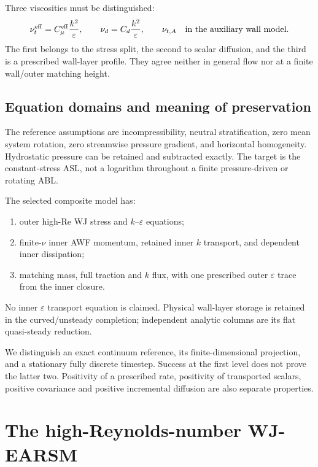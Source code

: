 \documentclass[11pt,a4paper]{article}
\numberwithin{equation}{section}
\newcommand{\eps}{\varepsilon}
\begin{document}
Three viscosities must be distinguished:
\begin{equation}
 \nu_t^{\rm eff}=C_\mu^{\rm eff}\frac{k^2}{\eps},
 \qquad \nu_d=C_d\frac{k^2}{\eps},
 \qquad \nu_{t,A}\quad\hbox{in the auxiliary wall model}.
 \label{eq:three-viscosities}
\end{equation}
The first belongs to the stress split, the second to scalar diffusion,
and the third is a prescribed wall-layer profile. They agree neither
in general flow nor at a finite wall/outer matching height.

\subsection{Equation domains and meaning of preservation}
The reference assumptions are incompressibility, neutral stratification,
zero mean system rotation, zero streamwise pressure gradient, and
horizontal homogeneity. Hydrostatic pressure can be retained and
subtracted exactly. The target is the constant-stress ASL, not a
logarithm throughout a finite pressure-driven or rotating ABL.

The selected composite model has:
\begin{enumerate}
\item outer high-Re WJ stress and $k$--$\eps$ equations;
\item finite-$\nu$ inner AWF momentum, retained inner $k$ transport,
and dependent inner dissipation;
\item matching mass, full traction and $k$ flux, with one prescribed
outer $\eps$ trace from the inner closure.
\end{enumerate}
No inner $\eps$ transport equation is claimed. Physical wall-layer
storage is retained in the curved/unsteady completion; independent
analytic columns are its flat quasi-steady reduction.

We distinguish an exact continuum reference, its finite-dimensional
projection, and a stationary fully discrete timestep. Success at the
first level does not prove the latter two. Positivity of a prescribed
rate, positivity of transported scalars, positive covariance and
positive incremental diffusion are also separate properties.

\section{The high-Reynolds-number WJ-EARSM}
\label{sec:wj-model}
\end{document}
